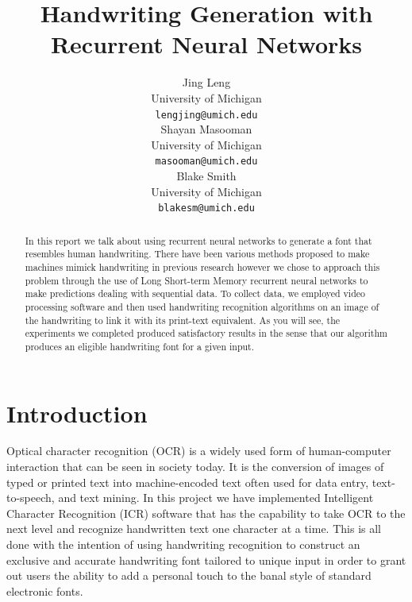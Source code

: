 \documentclass{article} %
\title{Handwriting Generation with Recurrent Neural Networks}
\author{
Jing Leng \\
University of Michigan\\
\texttt{lengjing@umich.edu} \\
\And
Shayan Masooman \\
University of Michigan \\
\texttt{masooman@umich.edu} \\
\And
Blake Smith\\
University of Michigan \\
\texttt{blakesm@umich.edu} \\
}
\begin{document}
\maketitle

\begin{abstract}
In this report we talk about using recurrent neural networks to generate a font that resembles human handwriting. There have been various methods proposed to make machines mimick handwriting in previous research however we chose to approach this problem through the use of Long Short-term Memory recurrent neural networks to make predictions dealing with sequential data. To collect data, we employed video processing software and then used handwriting recognition algorithms on an image of the handwriting to link it with its print-text equivalent. As you will see, the experiments we completed produced satisfactory results in the sense that our algorithm produces an eligible handwriting font for a given input. 

\end{abstract}


\section{Introduction}

Optical character recognition (OCR) is a widely used form of human-computer interaction that can be seen in society today. It is the conversion of images of typed or printed text into machine-encoded text often used for data entry, text-to-speech, and text mining. In this project we have implemented Intelligent Character Recognition (ICR) software that has the capability to take OCR to the next level and recognize handwritten text one character at a time. This is all done with the intention of using handwriting recognition to construct an exclusive and accurate handwriting font tailored to unique input in order to grant out users the ability to add a personal touch to the banal style of standard electronic fonts.
\end{document}
